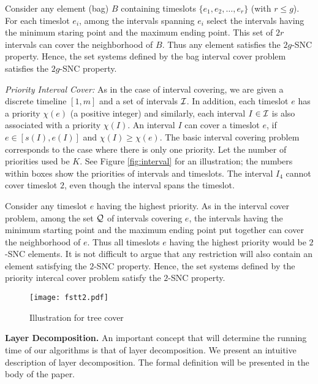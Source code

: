 \documentclass[11pt]{article}
\newcommand{\calQ} {{\cal Q}}
\newcommand{\calI} {{\cal I}}
\begin{document}
Consider any element (bag) $B$ containing timeslots $\{e_1, e_2, \ldots, e_r\}$ (with $r\leq g$).
For each timeslot $e_i$, among the intervals spanning $e_i$ select the intervals
having the minimum staring point and the maximum ending point.
This set of $2r$ intervals can cover the neighborhood of $B$.
Thus any element satisfies the $2g$-SNC property.
Hence, the set systems defined by the bag interval cover problem satisfies the $2g$-SNC property.

{\em Priority Interval Cover: }
As in the case of interval covering,
we are given a discrete timeline $[1,m]$ and a set of intervals $\calI$.
In addition, each timeslot $e$ has a priority $\chi(e)$ (a positive integer)
and similarly, each interval $I\in \calI$ is also associated with a priority $\chi(I)$.
An interval $I$ can cover a timeslot $e$, if $e\in [s(I),e(I)]$ and $\chi(I)\geq \chi(e)$.
The basic interval covering problem corresponds to the case where there is only one priority.
Let the number of priorities used be $K$. See Figure \ref{fig:interval} for an illustration;
the numbers within boxes show the priorities of intervals and timeslots.
The interval $I_4$ cannot cover timeslot $2$, even though the interval spans the timeslot.

Consider any timeslot $e$ having the highest priority. As in the interval cover problem,
among the set $\calQ$ of intervals covering $e$, the intervals having the minimum starting point
and the maximum ending point put together can cover the neighborhood of $e$.
Thus all timeslots $e$ having the highest priority would be $2$-SNC elements. 
It is not difficult to argue that any restriction will also contain an element satisfying the $2$-SNC property. 
Hence, the set systems defined by the priority intercal cover problem satisfy the $2$-SNC property.

\begin{figure}
\begin{center}
\texttt{[image: fstt2.pdf]}
\caption{Illustration for tree cover}
\label{fig:tree}
\end{center}
\end{figure}


{\bf Layer Decomposition.}
An important concept that will determine the running time of our algorithms is that of layer decomposition.
We present an intuitive description of layer decomposition. 
The formal definition will be presented in the body of the paper.
\end{document}
